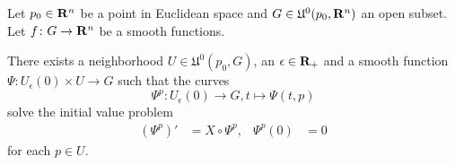 Let $p_0 \in \mathbf{R}^n$ be a point in Euclidean space and
$G \in \mathfrak U^0(p_0, \mathbf{R}^n)$ an open subset. Let $f\colon G \to \mathbf{R}^n$
be a smooth functions.

\begin{thm}
  \label{thm:diff_flow}
  There exists a neighborhood $U \in \mathfrak U^0(p_0, G)$, an
  $\epsilon \in \mathbf{R}_+$ and a smooth function $\Psi\colon
  U_\epsilon(0) \times U \to G$ such that the curves
  \[
    \Psi^p\colon U_\epsilon(0) \to G, t \mapsto \Psi(t, p)
  \]
  solve the initial value problem
  \begin{align*}
    (\Psi^p)' & = X \circ \Psi^p, &
    \Psi^p(0) & = 0
  \end{align*}
  for each $p \in U$.
\end{thm}

